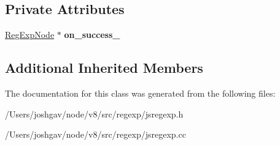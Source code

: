 \subsection*{Private Attributes}
\begin{DoxyCompactItemize}
\item 
\hyperlink{classv8_1_1internal_1_1_reg_exp_node}{Reg\+Exp\+Node} $\ast$ {\bfseries on\+\_\+success\+\_\+}\hypertarget{classv8_1_1internal_1_1_seq_reg_exp_node_a66de69d32413ed54abac6bf1d34263b3}{}\label{classv8_1_1internal_1_1_seq_reg_exp_node_a66de69d32413ed54abac6bf1d34263b3}

\end{DoxyCompactItemize}
\subsection*{Additional Inherited Members}


The documentation for this class was generated from the following files\+:\begin{DoxyCompactItemize}
\item 
/\+Users/joshgav/node/v8/src/regexp/jsregexp.\+h\item 
/\+Users/joshgav/node/v8/src/regexp/jsregexp.\+cc\end{DoxyCompactItemize}
